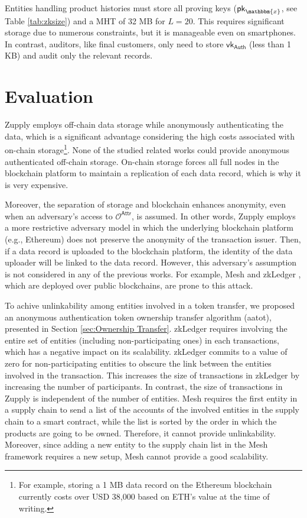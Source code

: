 Entities handling product histories must store all proving keys ($\mathsf{pk}_\mathbbm{x}$, see Table \ref{tab:zksize}) and a \textsf{MHT} of 32 MB for $L=20$. This requires significant storage due to numerous constraints, but it is manageable even on smartphones. In contrast, auditors, like final customers, only need to store $\mathsf{vk}_\mathsf{Auth}$ (less than 1 KB) and audit only the relevant records.

\section{Evaluation}
Zupply employs off-chain data storage while anonymously authenticating the data, which is a significant advantage considering the high costs associated with on-chain storage\footnote{For example, storing a 1 MB data record on the Ethereum blockchain currently costs over USD 38,000 based on ETH’s value at the time of writing.}. None of the studied related works could provide anonymous authenticated off-chain storage. On-chain storage forces all full nodes in the blockchain platform to maintain a replication of each data record, which is why it is very expensive.

Moreover, the separation of storage and blockchain enhances anonymity, even when an adversary's access to $\mathcal{O}^\mathsf{Attr}$, is assumed. In other words, Zupply employs a more restrictive adversary model in which the underlying blockchain platform (e.g., Ethereum) does not preserve the anonymity of the transaction issuer. Then, if a data record is uploaded to the blockchain platform, the identity of the data uploader will be linked to the data record. However, this adversary's assumption is not considered in any of the previous works. For example, Mesh \cite{altawy2019mesh} and zkLedger \cite{zkLedger2018}, which are deployed over public blockchains, are prone to this attack.


To achive unlinkability among entities involved in a token transfer, we proposed an anonymous authentication token ownership transfer algorithm (\gls{aatot}), presented in Section \ref{sec:Ownership Transfer}. zkLedger requires involving the entire set of entities (including non-participating ones) in each transactions, which has a negative impact on its scalability. zkLedger commits to a value of zero for non-participating entities to obscure the link between the entities involved in the transaction. This increases the size of transactions in zkLedger by increasing the number of participants.  In contrast, the size of transactions in Zupply is independent of the number of entities. Mesh requires the first entity in a supply chain to send a list of the accounts of the involved entities in the supply chain to a smart contract, while the list is sorted by the order in which the products are going to be owned. Therefore, it cannot  provide unlinkability. Moreover, since adding a new entity to the supply chain list in the Mesh framework requires a new setup, Mesh cannot provide a good scalability.

